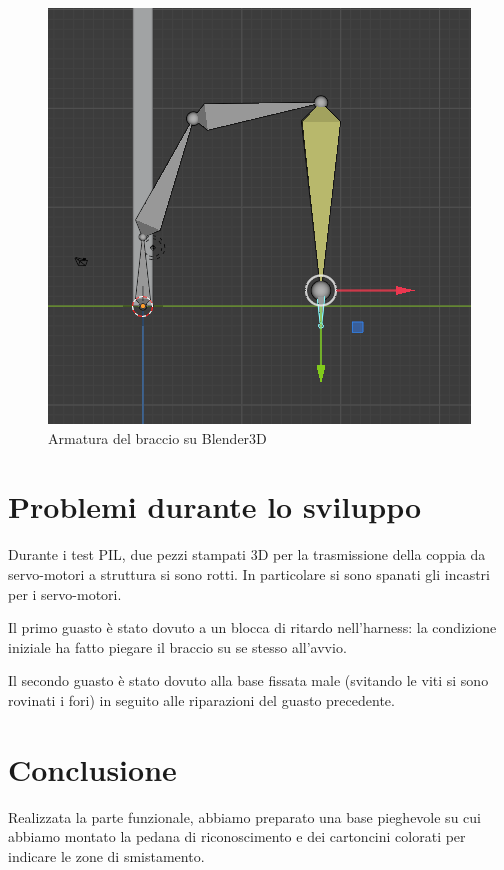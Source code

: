 \documentclass[12pt]{report}
\begin{document}
\begin{figure}
\includegraphics[width=\textwidth]{Blender3D}
\caption{Armatura del braccio su Blender3D}
\end{figure}

\chapter{Problemi durante lo sviluppo}

Durante i test PIL, due pezzi stampati 3D per la trasmissione della coppia da servo-motori a struttura si sono rotti. In particolare si sono spanati gli incastri per i servo-motori.

Il primo guasto è stato dovuto a un blocca di ritardo nell'harness: la condizione iniziale ha fatto piegare il braccio su se stesso all'avvio.

Il secondo guasto è stato dovuto alla base fissata male (svitando le viti si sono rovinati i fori) in seguito alle riparazioni del guasto precedente.

\chapter{Conclusione}

Realizzata la parte funzionale, abbiamo preparato una base pieghevole su cui abbiamo montato la pedana di riconoscimento e dei cartoncini colorati per indicare le zone di smistamento.
\end{document}

